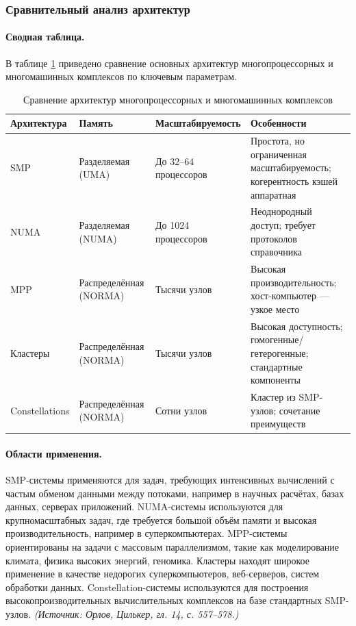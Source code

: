\documentclass[a4paper,12pt]{article}
\begin{document}
\subsubsection{Сравнительный анализ архитектур}

\paragraph{Сводная таблица.}
В таблице \ref{tab:comparison} приведено сравнение основных архитектур многопроцессорных и многомашинных комплексов по ключевым параметрам.

\begin{table}[h]
\centering
\caption{Сравнение архитектур многопроцессорных и многомашинных комплексов}
\label{tab:comparison}
\begin{tabular}{p{3cm}p{3cm}p{3cm}p{3cm}}
\toprule
\textbf{Архитектура} & \textbf{Память} & \textbf{Масштабируемость} & \textbf{Особенности} \\
\midrule
SMP & Разделяемая (UMA) & До 32--64 процессоров & Простота, но ограниченная масштабируемость; когерентность кэшей аппаратная \\
NUMA & Разделяемая (NUMA) & До 1024 процессоров & Неоднородный доступ; требует протоколов справочника \\
MPP & Распределённая (NORMA) & Тысячи узлов & Высокая производительность; хост-компьютер — узкое место \\
Кластеры & Распределённая (NORMA) & Тысячи узлов & Высокая доступность; гомогенные/гетерогенные; стандартные компоненты \\
Constellations & Распределённая (NORMA) & Сотни узлов & Кластер из SMP-узлов; сочетание преимуществ \\
\bottomrule
\end{tabular}
\end{table}

\paragraph{Области применения.}
SMP-системы применяются для задач, требующих интенсивных вычислений с частым обменом данными между потоками, например в научных расчётах, базах данных, серверах приложений. NUMA-системы используются для крупномасштабных задач, где требуется большой объём памяти и высокая производительность, например в суперкомпьютерах. MPP-системы ориентированы на задачи с массовым параллелизмом, такие как моделирование климата, физика высоких энергий, геномика. Кластеры находят широкое применение в качестве недорогих суперкомпьютеров, веб-серверов, систем обработки данных. Constellation-системы используются для построения высокопроизводительных вычислительных комплексов на базе стандартных SMP-узлов.
\textit{(Источник: Орлов, Цилькер, гл. 14, с. 557--578.)}
\end{document}
